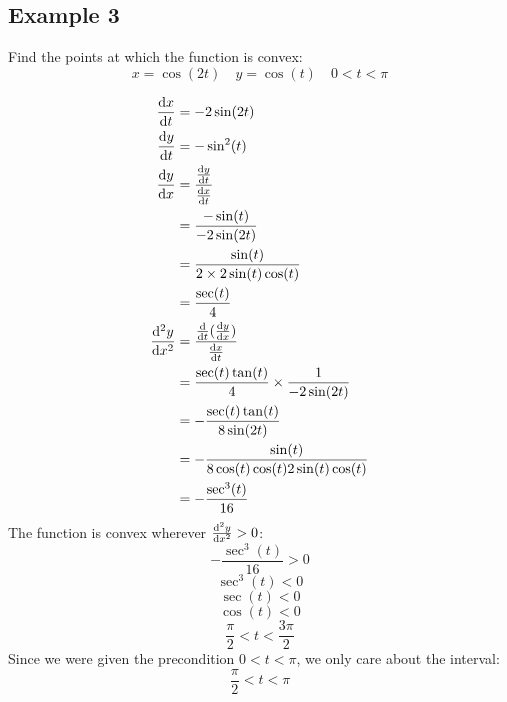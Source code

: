 \documentclass[letterpaper, 12pt]{math}
\begin{document}
\subsection*{Example 3}
Find the points at which the function is convex:
\[ x = \cos(2t) \quad y = \cos(t) \quad 0 < t < \pi \]
\begin{center}
\end{center}
\begin{align*}
  \frac{\mathrm{d}{x}}{\mathrm{d}{t}} &= -2\sin(2t) \\
  \frac{\mathrm{d}{y}}{\mathrm{d}{t}} &= -\sin^{2}(t) \\
  \frac{\mathrm{d}{y}}{\mathrm{d}{x}} &=
    \frac{\frac{\mathrm{d}{y}}{\mathrm{d}{t}}}{\frac{\mathrm{d}{x}}{\mathrm{d}{t}}} \\
  &= \frac{-\sin(t)}{-2\sin(2t)} \\
  &= \frac{\sin(t)}{2\times2\sin(t)\cos(t)} \\
  &= \frac{\sec(t)}{4} \\
  \frac{\mathrm{d^2}{y}}{\mathrm{d}{x}^{2}} &=
    \frac{\frac{\mathrm{d}}{\mathrm{d}{t}}(\frac{\mathrm{d}{y}}{\mathrm{d}{x}})}
      {\frac{\mathrm{d}{x}}{\mathrm{d}{t}}} \\
  &= \frac{\sec(t)\tan(t)}{4}\times\frac{1}{-2\sin(2t)} \\
  &= -\frac{\sec(t)\tan(t)}{8\sin(2t)} \\
  &= -\frac{\sin(t)}{8\cos(t)\cos(t)2\sin(t)\cos(t)} \\
  &= -\frac{\sec^{3}(t)}{16}
\end{align*}
The function is convex wherever \( \frac{\mathrm{d^2}{y}}{\mathrm{d}{x}^{2}} > 0 \):
\[ -\frac{\sec^{3}(t)}{16} > 0 \]
\[ \sec^{3}(t) < 0 \]
\[ \sec(t) < 0 \]
\[ \cos(t) < 0 \]
\[ \frac{\pi}{2} < t < \frac{3\pi}{2} \]
Since we were given the precondition \( 0 < t < \pi \), we only care about the
interval:
\[ \frac{\pi}{2} < t < \pi \]
\end{document}
